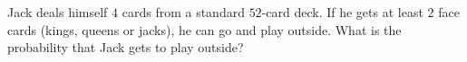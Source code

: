 Jack deals himself $4$ cards from a standard $52$-card deck. If he gets at least $2$ face cards (kings, queens or jacks), he can go and play outside. What is the probability that Jack gets to play outside?
